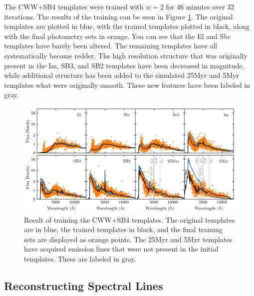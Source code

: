 \documentclass[twocolumn]{aastex63}
\begin{document}
    The CWW+SB4 templates were trained with $w=2$ for 46 minutes over 32 iterations.
    The results of the training can be seen in Figure \ref{fig:cwwsb4_trained}.
    The original templates are plotted in blue, with the trained templates plotted in black, along with the final photometry sets in orange.
    You can see that the El and Sbc templates have barely been altered. The remaining templates have all systematically become redder.
    The high resolution structure that was originally present in the Im, SB3, and SB2 templates have been decreased in magnitude, while additional structure has been added to the simulated 25Myr and 5Myr templates what were originally smooth.
    These new features have been labeled in gray.

    \begin{figure}
        \centering
        \includegraphics{cwwsb4_trained.png}
        \caption{Result of training the CWW+SB4 templates. The original templates are in blue, the trained templates in black, and the final training sets are displayed as orange points. The 25Myr and 5Myr templates have acquired emission lines that were not present in the initial templates. These are labeled in gray.}
        \label{fig:cwwsb4_trained}
    \end{figure}



    \subsection{Reconstructing Spectral Lines}
    \label{sect:speclines}
\end{document}
